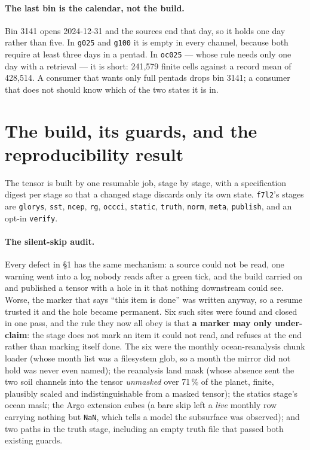 \documentclass[10pt]{article}
\newcommand{\code}[1]{\texttt{#1}}
\begin{document}
\paragraph{The last bin is the calendar, not the build.} Bin 3141 opens
2024-12-31 and the sources end that day, so it holds one day rather than five.
In \code{g025} and \code{g100} it is empty in every channel, because both
require at least three days in a pentad. In \code{oc025} --- whose rule needs
only one day with a retrieval --- it is short: 241,579 finite cells against a
record mean of 428,514. A consumer that wants only full pentads drops bin
3141; a consumer that does not should know which of the two states it is in.

\section{The build, its guards, and the reproducibility result}

The tensor is built by one resumable job, stage by stage, with a
specification digest per stage so that a changed stage discards only its own
state. \code{f7l2}'s stages are \code{glorys}, \code{sst}, \code{ncep},
\code{rg}, \code{occci}, \code{static}, \code{truth}, \code{norm},
\code{meta}, \code{publish}, and an opt-in \code{verify}.

\paragraph{The silent-skip audit.} Every defect in \S1 has the same mechanism:
a source could not be read, one warning went into a log nobody reads after a
green tick, and the build carried on and published a tensor with a hole in it
that nothing downstream could see. Worse, the marker that says ``this item is
done'' was written anyway, so a resume trusted it and the hole became
permanent. Six such sites were found and closed in one pass, and the rule they
now all obey is that \textbf{a marker may only under-claim}: the stage does not
mark an item it could not read, and refuses at the end rather than marking
itself done. The six were the monthly ocean-reanalysis chunk loader (whose
month list was a filesystem glob, so a month the mirror did not hold was never
even named); the reanalysis land mask (whose absence sent the two soil channels
into the tensor \emph{unmasked} over 71\,\% of the planet, finite, plausibly
scaled and indistinguishable from a masked tensor); the statics stage's ocean
mask; the Argo extension cubes (a bare skip left a \emph{live} monthly row
carrying nothing but \code{NaN}, which tells a model the subsurface was
observed); and two paths in the truth stage, including an empty truth file that
passed both existing guards.
\end{document}
